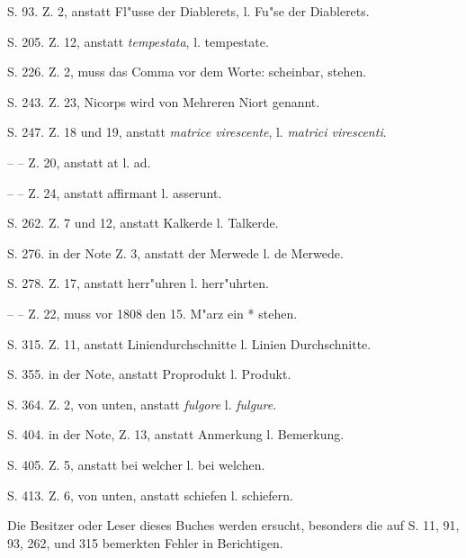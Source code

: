 \documentclass[a4paper, 11pt, oneside, polutonikogreek, german]{article}
\begin{document}
S. 93. Z. 2, anstatt Fl"usse der Diablerets, l. Fu"se der Diablerets.

S. 205. Z. 12, anstatt \emph{tempestata}, l. tempestate.

S. 226. Z. 2, muss das Comma vor dem Worte: scheinbar, stehen.

S. 243. Z. 23, Nicorps wird von Mehreren Niort genannt.

S. 247. Z. 18 und 19, anstatt \emph{matrice virescente}, l. \emph{matrici virescenti}.

-- -- Z. 20, anstatt at l. ad.

-- -- Z. 24, anstatt affirmant l. asserunt.

S. 262. Z. 7 und 12, anstatt Kalkerde l. Talkerde.

S. 276. in der Note Z. 3, anstatt der Merwede l. de Merwede.

S. 278. Z. 17, anstatt herr"uhren l. herr"uhrten.

-- -- Z. 22, muss vor 1808 den 15. M"arz ein * stehen.

S. 315. Z. 11, anstatt Liniendurchschnitte l. Linien Durchschnitte.

S. 355. in der Note, anstatt Proprodukt l. Produkt.

S. 364. Z. 2, von unten, anstatt \emph{fulgore} l. \emph{fulgure}.

S. 404. in der Note, Z. 13, anstatt Anmerkung l. Bemerkung.

S. 405. Z. 5, anstatt bei welcher l. bei welchen.

S. 413. Z. 6, von unten, anstatt schiefen l. schiefern.

Die Besitzer oder Leser dieses Buches werden ersucht, besonders die auf S. 11, 91, 93, 262, und 315 bemerkten Fehler in Berichtigen.
\clearpage
\section{}
\subsection{}
\end{document}

